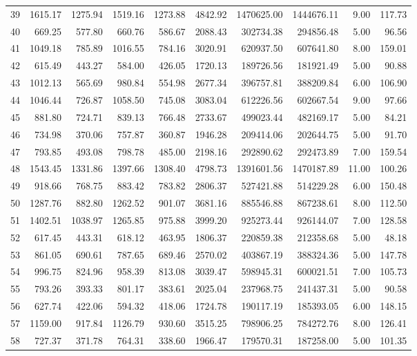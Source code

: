 \begin{tabular}{lrrrrrrrrr}
39 & 1615.17 & 1275.94 & 1519.16 & 1273.88 & 4842.92 & 1470625.00 & 1444676.11 & 9.00 & 117.73 \\
40 & 669.25 & 577.80 & 660.76 & 586.67 & 2088.43 & 302734.38 & 294856.48 & 5.00 & 96.56 \\
41 & 1049.18 & 785.89 & 1016.55 & 784.16 & 3020.91 & 620937.50 & 607641.80 & 8.00 & 159.01 \\
42 & 615.49 & 443.27 & 584.00 & 426.05 & 1720.13 & 189726.56 & 181921.49 & 5.00 & 90.88 \\
43 & 1012.13 & 565.69 & 980.84 & 554.98 & 2677.34 & 396757.81 & 388209.84 & 6.00 & 106.90 \\
44 & 1046.44 & 726.87 & 1058.50 & 745.08 & 3083.04 & 612226.56 & 602667.54 & 9.00 & 97.66 \\
45 & 881.80 & 724.71 & 839.13 & 766.48 & 2733.67 & 499023.44 & 482169.17 & 5.00 & 84.21 \\
46 & 734.98 & 370.06 & 757.87 & 360.87 & 1946.28 & 209414.06 & 202644.75 & 5.00 & 91.70 \\
47 & 793.85 & 493.08 & 798.78 & 485.00 & 2198.16 & 292890.62 & 292473.89 & 7.00 & 159.54 \\
48 & 1543.45 & 1331.86 & 1397.66 & 1308.40 & 4798.73 & 1391601.56 & 1470187.89 & 11.00 & 100.26 \\
49 & 918.66 & 768.75 & 883.42 & 783.82 & 2806.37 & 527421.88 & 514229.28 & 6.00 & 150.48 \\
50 & 1287.76 & 882.80 & 1262.52 & 901.07 & 3681.16 & 885546.88 & 867238.61 & 8.00 & 112.50 \\
51 & 1402.51 & 1038.97 & 1265.85 & 975.88 & 3999.20 & 925273.44 & 926144.07 & 7.00 & 128.58 \\
52 & 617.45 & 443.31 & 618.12 & 463.95 & 1806.37 & 220859.38 & 212358.68 & 5.00 & 48.18 \\
53 & 861.05 & 690.61 & 787.65 & 689.46 & 2570.02 & 403867.19 & 388324.36 & 5.00 & 147.78 \\
54 & 996.75 & 824.96 & 958.39 & 813.08 & 3039.47 & 598945.31 & 600021.51 & 7.00 & 105.73 \\
55 & 793.26 & 393.33 & 801.17 & 383.61 & 2025.04 & 237968.75 & 241437.31 & 5.00 & 90.58 \\
56 & 627.74 & 422.06 & 594.32 & 418.06 & 1724.78 & 190117.19 & 185393.05 & 6.00 & 148.15 \\
57 & 1159.00 & 917.84 & 1126.79 & 930.60 & 3515.25 & 798906.25 & 784272.76 & 8.00 & 126.41 \\
58 & 727.37 & 371.78 & 764.31 & 338.60 & 1966.47 & 179570.31 & 187258.00 & 5.00 & 101.35 \\

\end{tabular}

